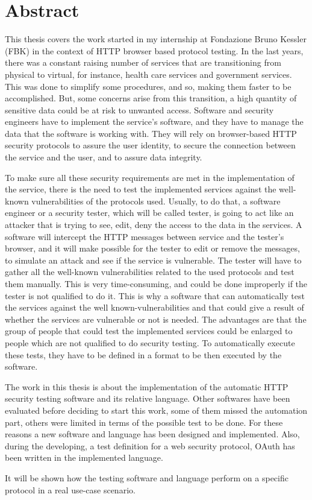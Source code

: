 \chapter*{Abstract} %

This thesis covers the work started in my internship at Fondazione Bruno Kessler (FBK) in the context of HTTP browser based protocol testing.
In the last years, there was a constant raising number of services that are transitioning from physical to virtual, for instance, health care services and government services. This was done to simplify some procedures, and so, making them faster to be accomplished. But, some concerns arise from this transition, a high quantity of sensitive data could be at risk to unwanted access. Software and security engineers have to implement the service's software, and they have to manage the data that the software is working with. They will rely on browser-based HTTP security protocols to assure the user identity, to secure the connection between the service and the user, and to assure data integrity. 

To make sure all these security requirements are met in the implementation of the service, there is the need to test the implemented services against the well-known vulnerabilities of the protocols used. Usually, to do that, a software engineer or a security tester, which will be called tester, is going to act like an attacker that is trying to see, edit, deny the access to the data in the services. A software will intercept the HTTP messages between service and the tester's browser, and it will make possible for the tester to edit or remove the messages, to simulate an attack and see if the service is vulnerable. The tester will have to gather all the well-known vulnerabilities related to the used protocols and test them manually. This is very time-consuming, and could be done improperly if the tester is not qualified to do it. This is why a software that can automatically test the services against the well known-vulnerabilities and that could give a result of whether the services are vulnerable or not is needed. The advantages are that the group of people that could test the implemented services could be enlarged to people which are not qualified to do security testing. To automatically execute these tests, they have to be defined in a format to be then executed by the software. 

The work in this thesis is about the implementation of the automatic HTTP security testing software and its relative language. Other softwares have been evaluated before deciding to start this work, some of them missed the automation part, others were limited in terms of the possible test to be done. For these reasons a new software and language has been designed and implemented. Also, during the developing, a test definition for a web security protocol, \gls{OAuth} has been written in the implemented language.

It will be shown how the testing software and language perform on a specific protocol in a real use-case scenario.




